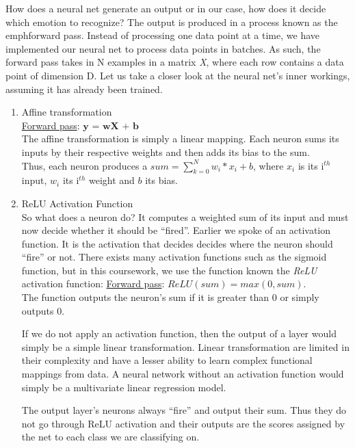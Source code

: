 How does a neural net generate an output or in our case, how does it decide which emotion to recognize?
The output is produced in a process known as the emph{forward pass}.
Instead of processing one data point at a time,
we have implemented our neural net to process data points in batches.
As such, the forward pass takes in N examples in a matrix \emph{X}, where each row contains a data point of dimension D.
Let us take a closer look at the neural net's inner workings, assuming it has already been trained.

\begin{enumerate}
   \item Affine transformation\\
     \underline{Forward pass}: $\textbf{y = wX + b}$\\
     The affine transformation is simply a linear mapping.
     Each neuron sums its inputs by their respective weights and then adds its bias to the sum.\\
     Thus, each neuron produces a $sum = \sum_{k=0}^{N} w_i * x_i + b$,
     where $x_i$ is its i$^{th}$ input, $w_i$ its i$^{th}$ weight and $b$ its bias.
     
   \item ReLU Activation Function\\
     
     So what does a neuron do? It computes a weighted sum of its input and must now decide whether it should be ``fired''.
     Earlier we spoke of an activation function.
     It is the activation that decides decides where the neuron should ``fire'' or not. 
     There exists many activation functions such as the sigmoid function,
     but in this coursework, we use the function known the \emph{ReLU} activation function:
     \underline{Forward pass}:
     $ReLU(sum) = max(0,sum)$.\\
     The function outputs the neuron's sum if it is greater than 0 or simply outputs 0.
     
     If we do not apply an activation function, then the output of a layer would simply be a simple linear transformation.
     Linear transformation are limited in their complexity and have a lesser ability to learn complex functional mappings from data.
     A neural network without an activation function would simply be a multivariate linear regression model.

     The output layer's neurons always ``fire'' and output their sum.
     Thus they do not go through ReLU activation and
     their outputs are the scores assigned by the net to each class we are classifying on.
     
\end{enumerate}
